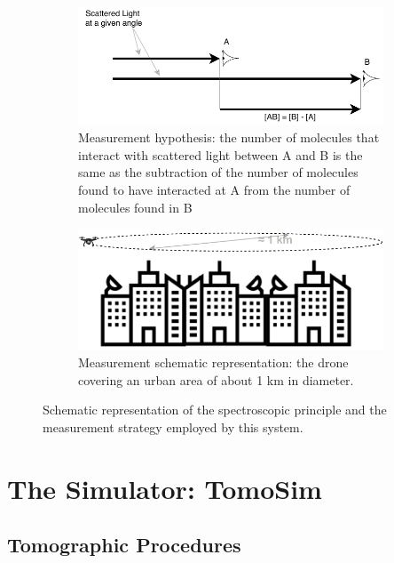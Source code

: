 \begin{figure}
    \begin{subfigure}[t]{.49\textwidth}
    \includegraphics[width=\linewidth]{img/pdf/spectralMeasurementSketch.pdf}
    \caption{Measurement hypothesis: the number of molecules that
    interact with scattered light between A and B is the same as the
    subtraction of the number of molecules found to have interacted at A
    from the number of molecules found in B}
    \label{fig:measurement_hypothesis}
\end{subfigure}
\hfill
\begin{subfigure}[t]{.49\textwidth}
    \includegraphics[width=\linewidth]{img/pdf/spectralMeasurementsFromTheSide.pdf}
    \caption{Measurement schematic representation: the drone covering
    an urban area of about 1 km in diameter.}
    \label{fig:measurements_from_the_side}
\end{subfigure}
\caption{Schematic representation of the spectroscopic principle and the
measurement strategy employed by this system.}
\label{fig:measurement_strategy_schematics}
\end{figure}

\section{The Simulator: TomoSim}%
\label{sec:the_simulator_tomosim}

\subsection{Tomographic Procedures}%
\label{sub:tomographic_procedures}

